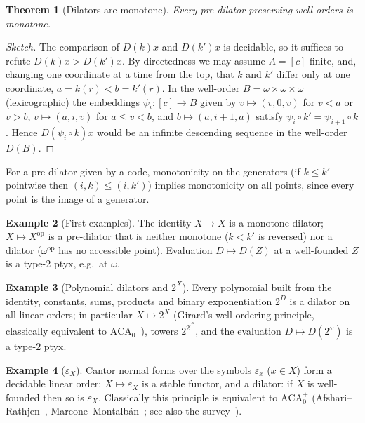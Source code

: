 \documentclass[11pt]{article}
\newtheorem{theorem}{Theorem}[section]
\theoremstyle{definition}
\newtheorem{example}[theorem]{Example}
\theoremstyle{remark}
\begin{document}
\begin{theorem}[Dilators are monotone]\label{thm:mono}
Every pre-dilator preserving well-orders is monotone.
\end{theorem}

\begin{proof}[Sketch]
The comparison of $D(k)x$ and $D(k')x$ is decidable, so it suffices to
refute $D(k)x>D(k')x$. By directedness we may assume $A=[c]$ finite, and,
changing one coordinate at a time from the top, that $k$ and $k'$ differ
only at one coordinate, $a=k(r)<b=k'(r)$. In the well-order
$B=\omega\times\omega\times\omega$ (lexicographic) the embeddings
$\psi_i:[c]\to B$ given by $v\mapsto(v,0,v)$ for $v<a$ or $v>b$,
$v\mapsto(a,i,v)$ for $a\le v<b$, and $b\mapsto(a,i+1,a)$ satisfy
$\psi_i\circ k'=\psi_{i+1}\circ k$. Hence $D(\psi_i\circ k)x$ would be an
infinite descending sequence in the well-order $D(B)$.
\end{proof}

For a pre-dilator given by a code, monotonicity on the generators (if
$k\le k'$ pointwise then $(i,k)\le(i,k')$) implies monotonicity on all
points, since every point is the image of a generator.

\begin{example}[First examples]
The identity $X\mapsto X$ is a monotone dilator; $X\mapsto X^{\mathrm{op}}$
is a pre-dilator that is neither monotone ($k<k'$ is reversed) nor a dilator
($\omega^{\mathrm{op}}$ has no accessible point). Evaluation
$D\mapsto D(Z)$ at a well-founded $Z$ is a type-2 ptyx, e.g.\ at $\omega$.
\end{example}

\begin{example}[Polynomial dilators and $2^X$]
Every polynomial built from the identity, constants, sums, products and
binary exponentiation $2^D$ is a dilator on all linear orders; in
particular $X\mapsto 2^X$ (Girard's well-ordering principle, classically
equivalent to $\mathrm{ACA}_0$~\cite{GirPTLC}), towers $2^{2^{\cdot^{\cdot^X}}}$, and the
evaluation $D\mapsto D(2^\omega)$ is a type-2 ptyx.
\end{example}

\begin{example}[$\varepsilon_X$]
Cantor normal forms over the symbols $\varepsilon_x$ ($x\in X$) form a
decidable linear order; $X\mapsto\varepsilon_X$ is a stable functor, and a
dilator: if $X$ is well-founded then so is $\varepsilon_X$. Classically
this principle is equivalent to $\mathrm{ACA}_0^+$ (Afshari--Rathjen~\cite{AR},
Marcone--Montalb\'an~\cite{MM}; see also the survey~\cite{Rat21}).
\end{example}
\end{document}
